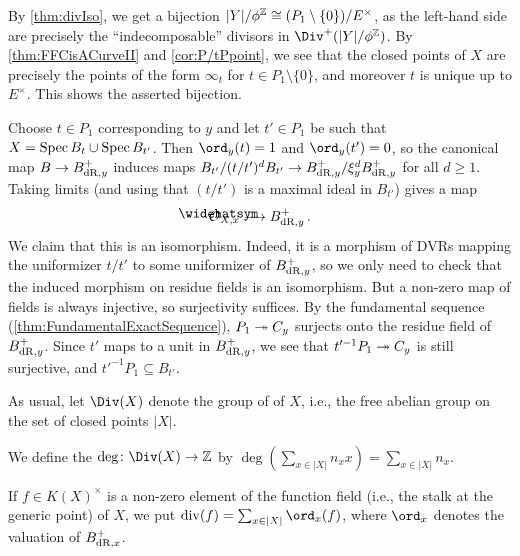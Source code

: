 \documentclass[a4paper, 10pt, oneside, DIV=9, chapterprefix=true, numbers=enddot,bibliography=totoc]{scrbook}
\begin{document}
\begin{proof*}
	By \cref{thm:divIso}, we get a bijection $|Y|/\phi^\IZ\cong (P_1\setminus\{0\})/E^\times$, as the left-hand side are precisely the \enquote{indecomposable} divisors in $\Div^+(|Y|/\phi^\IZ)$. By \cref{thm:FFCisACurveII} and \cref{cor:P/tPpoint}, we see that the closed points of $X$ are precisely the points of the form $\infty_t$ for $t\in P_1\setminus\{0\}$, and moreover $t$ is unique up to $E^\times$. This shows the asserted bijection.
	
	Choose $t\in P_1$ corresponding to $y$ and let $t'\in P_1$ be such that $X=\operatorname{Spec} B_t\cup \operatorname{Spec} B_{t'}$. Then $\ord_y(t)=1$ and $\ord_y(t')=0$, so the canonical map $B\morphism B_{\dR,y}^+$ induces maps $B_{t'}/(t/t')^dB_{t'}\morphism B_{\dR,y}^+/\xi_y^dB_{\dR,y}^+$ for all $d\geq 1$. Taking limits (and using that $(t/t')$ is a maximal ideal in $B_{t'}$) gives a map 
	\begin{equation*}
		\roof{\Oo}_{X,x}\morphism B_{\dR,y}^+\,.
	\end{equation*}
	We claim that this is an isomorphism. Indeed, it is a morphism of DVRs mapping the uniformizer $t/t'$ to some uniformizer of $B_{\mathrm{dR},y}^+$, so we only need to check that the induced morphism on residue fields is an isomorphism. But a non-zero map of fields is always injective, so surjectivity suffices. By the fundamental sequence (\cref{thm:FundamentalExactSequence}), $P_1\epimorphism C_y$ surjects onto the residue field of $B_{\mathrm{dR},y}^+$. Since $t'$ maps to a unit in $B_{\mathrm{dR},y}^+$, we see that $t'^{-1}P_1\epimorphism C_y$ is still surjective, and $t'^{-1}P_1\subseteq B_{t'}$.
\end{proof*}
\begin{defi}\label{def:deg}
	As usual, let $\Div(X)$ denote the group of  of $X$, i.e., the free abelian group on the set of closed points $|X|$.
	\begin{numerate}
		\item We define the  $\deg\colon \Div(X)\morphism \IZ$ by $\deg\left(\sum_{x\in |X|}n_xx\right)=\sum_{x\in |X|}n_x$.
		\item If $f\in K(X)^\times$ is a non-zero element of the function field (i.e., the stalk at the generic point) of $X$, we put $\div(f)=\sum_{x\in |X|}\ord_x(f)$, where $\ord_x$ denotes the valuation of $B_{\mathrm{dR},x}^+$.
	\end{numerate}
\end{defi}
\end{document}
